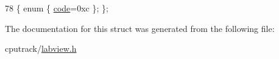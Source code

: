 \begin{DoxyCode}
78 \{ \textcolor{keyword}{enum} \{ \hyperlink{struct_l_v_1_1_l_v_data_type_3_01std_1_1complex_3_01float_01_4_01_4_aca703b4c0c2e2a3d7105157ae24315e5ad74606b0c541f8577e62dce2598b298a}{code}=0xc \}; \};
\end{DoxyCode}


The documentation for this struct was generated from the following file\+:\begin{DoxyCompactItemize}
\item 
cputrack/\hyperlink{labview_8h}{labview.\+h}\end{DoxyCompactItemize}
